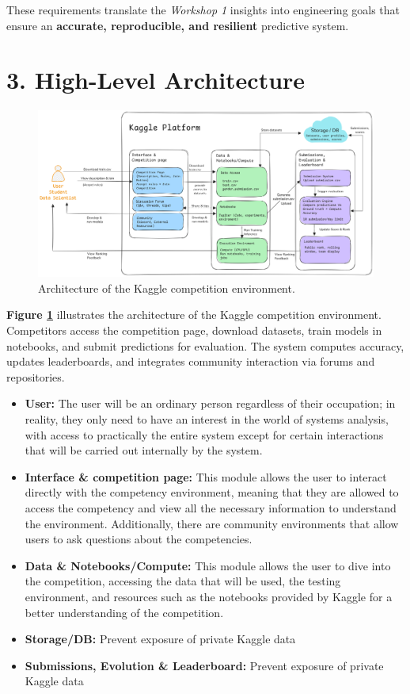 \documentclass[12pt]{report}
\begin{document}
\noindent
These requirements translate the \textit{Workshop 1} insights into engineering goals that ensure an \textbf{accurate, reproducible, and resilient} predictive system.

\section*{3. High-Level Architecture}
\begin{figure}[H]
    \centering
    \includegraphics[width=\linewidth]{Figure1.png}
    \caption{Architecture of the Kaggle competition environment.}
    \label{fig:system-architecture}
\end{figure}

\noindent
\textbf{Figure \ref{fig:system-architecture}} illustrates the architecture of the Kaggle competition environment. Competitors access the competition page, download datasets, train models in notebooks, and submit predictions for evaluation. The system computes accuracy, updates leaderboards, and integrates community interaction via forums and repositories.
\begin{itemize}
    \item \textbf{User:} The user will be an ordinary person regardless of their occupation; in reality, they only need to have an interest in the world of systems analysis, with access to practically the entire system except for certain interactions that will be carried out internally by the system.
    \item \textbf{Interface \& competition page:} This module allows the user to interact directly with the competency environment, meaning that they are allowed to access the competency and view all the necessary information to understand the environment. Additionally, there are community environments that allow users to ask questions about the competencies.
    \item \textbf{Data \& Notebooks/Compute:} This module allows the user to dive into the competition, accessing the data that will be used, the testing environment, and resources such as the notebooks provided by Kaggle for a better understanding of the competition.
    \item \textbf{Storage/DB:} Prevent exposure of private Kaggle data
    \item \textbf{Submissions, Evolution \& Leaderboard:} Prevent exposure of private Kaggle data
\end{itemize}
\end{document}
